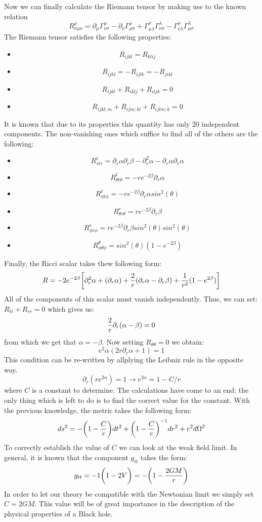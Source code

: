 \documentclass[]{article}
\theoremstyle{definition}
\theoremstyle{Theorem}
\theoremstyle{definition}
\theoremstyle{definition}
\theoremstyle{definition}
\begin{document}
Now we can finally calculate the Riemann tensor by making use to the known relation 
$$R^\rho_{\sigma\mu\nu}=\partial_\mu\Gamma^\rho_{\nu\sigma}-\partial_\nu\Gamma^\rho_{\mu\sigma}+\Gamma^\rho_{\mu\lambda}\Gamma^\lambda_{\nu\sigma}-\Gamma^\rho_{\nu\lambda}\Gamma^\lambda_{\mu\sigma}$$ 
The Riemann tensor satisfies the following properties:
\begin{itemize}
	\item $$R_{ijkl}=R_{klij}$$
	\item $$R_{ijkl}=-R_{ijlk}=-R_{jikl}$$
	\item $$R_{ijkl}+R_{iklj}+R_{iljk}=0$$
	\item $$R_{ijkl;m}+R_{ijm;kl}+R_{ijlm;k}=0$$
\end{itemize}
It is known that due to its properties this quantity has only 20 independent components. The non-vanishing ones which suffice to find all of the others are the following:
\begin{itemize}
	\item $$R^{t}_{rtr}=\partial_r\alpha\partial_r\beta-\partial_r^2\alpha-\partial_r\alpha\partial_r\alpha$$
	\item $$R^{t}_{\theta t\theta}=-re^{-2\beta}\partial_r\alpha$$
	\item $$R^{t}_{\phi t\phi}=-re^{-2\beta}\partial_r\alpha sin^2(\theta)$$
	\item $$R^{r}_{\theta r\theta}=re^{-2\beta}\partial_r\beta$$
	\item $$R^{r}_{\phi r\phi }=re^{-2\beta}\partial_r\beta sin^2(\theta)sin^2(\theta)$$
	\item $$R^{\theta}_{\phi\theta\phi}=sin^2(\theta)(1-e^{-2\beta})$$
\end{itemize}
Finally, the Ricci scalar takes thew following form:
$$R=-2e^{-2\beta}\bigg[\partial_r^2\alpha+(\partial_r\alpha)+{2\over r}(\partial_r\alpha-\partial_r\beta)+{1\over r^2}(1-e^{2\beta})\bigg]$$
All of the components of this scalar must vanish independently. Thus, we can set: $R_{tt}+R_{rr}=0$ which gives us:
$${2\over r}\partial_r (\alpha-\beta)=0$$ 
from which we get that $\alpha=-\beta$. Now setting $R_{\theta\theta}=0$ we obtain:
$$e^2\alpha(2r\partial_r\alpha+1)=1$$
This condition can be re-written by allplying the Leibniz rule in the opposite way.
$$\partial_r(re^{2\alpha})=1\longrightarrow e^{2\alpha}=1-{C/r}$$
where $C$ is a constant to determine. The calculations have come to an end: the only thing which is left to do is to find the correct value for the constant. With the previous knowledge, the metric takes the following form:
$$ds^2=-\bigg(1-{C\over r}\bigg)dt^2+\bigg(1-{C\over r}\bigg)^{-1}dr^2+r^2d\Omega^2$$
To correctly establish the value of $C$ we can look at the weak field limit. In general, it is known that the component $g_{tt}$ takes the form:
$$g_{tt}=-1\bigg(1-2V\bigg)=-\bigg(1-{2GM\over r}\bigg)$$
In order to let our theory be compatible with the Newtonian limit we simply set $C=2GM$. This value will be of great importance in the description of the physical properties of a Black hole.
\end{document}
